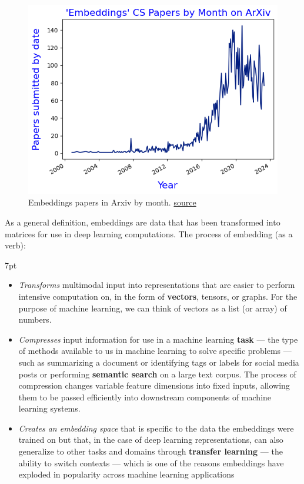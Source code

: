 \documentclass[11pt, table]{diazessay} %
\newenvironment{formal}{%
  \def\FrameCommand{%
    \hspace{1pt}%
    {\color{w_lightblue}\vrule width 2pt}%
    {\color{formalshade}\vrule width 4pt}%
    \colorbox{formalshade}%
  }%
  \MakeFramed{\advance\hsize-\width\FrameRestore}%
  \noindent\hspace{-4.55pt}%
  \begin{adjustwidth}{}{7pt}%
  \vspace{2pt}\vspace{2pt}%
}
{%
  \vspace{2pt}\end{adjustwidth}\endMakeFramed%
}
\begin{document}
\begin{sloppypar}
\begin{figure}[H]
\centering
\includegraphics[width=\linewidth]{figures/embeddings1.png} 
\caption{Embeddings papers in Arxiv by month. \href{https://github.com/veekaybee/embeddings_code/blob/main/fig_2_embeddings_papers.ipynb}{source}}
\end{figure}

As a general definition, embeddings are data that has been transformed into matrices for use in deep learning computations. The process of embedding (as a verb):  
\begin{formal}
\begin{itemize}
   \item \emph{Transforms} multimodal input into representations that are easier to perform intensive computation on, in the form of \textbf{vectors}, tensors, or graphs\citep{rao2019natural}. For the purpose of machine learning, we can think of vectors as a list (or array) of numbers.
  \item \emph{Compresses} input information for use in a machine learning \textbf{task} --- the type of methods available to us in machine learning to solve specific problems --- such as summarizing a document or identifying tags or labels for social media posts or performing \textbf{semantic search} on a large text corpus. The process of compression changes variable feature dimensions into fixed inputs, allowing them to be passed efficiently into downstream components of machine learning systems. 
  \item \emph{Creates an embedding space} that is specific to the data the embeddings were trained on but that, in the case of deep learning representations, can also generalize to other tasks and domains through \textbf{transfer learning} --- the ability to switch contexts --- which is one of the reasons embeddings have exploded in popularity across machine learning applications
\end{itemize}
\end{formal}


\end{sloppypar}
\end{document}
